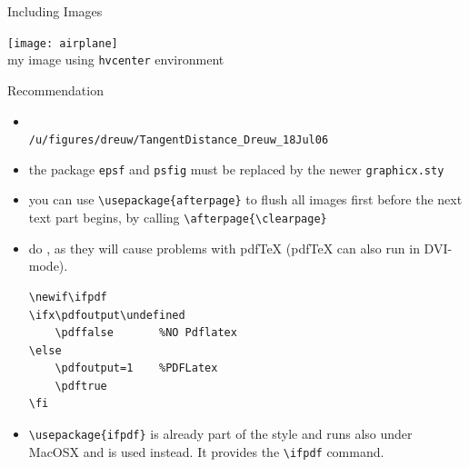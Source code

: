 \documentclass[11pt,a4paper,landscape]{article}
\begin{document}
\NewPage\centerline{Including Images}
\begin{hvcenter}
  \texttt{[image: airplane]}\\
  my image using \texttt{hvcenter} environment
\end{hvcenter}

\NewPage\centerline{Recommendation}
\vfill
\begin{itemize}
\item {} \\
  \eg \texttt{/u/figures/dreuw/TangentDistance\_Dreuw\_18Jul06}
\item the package \texttt{epsf} and \texttt{psfig} must be replaced by the newer
  \texttt{graphicx.sty}
\item you can use \texttt{\textbackslash usepackage\{afterpage\}} to flush all
  images first before the next text part begins, by calling
  \texttt{\textbackslash afterpage\{\textbackslash clearpage\}}
\item do , as they will cause
  problems with pdfTeX (pdfTeX can also run in DVI-mode).
\begin{verbatim}
\newif\ifpdf
\ifx\pdfoutput\undefined
    \pdffalse       %NO Pdflatex
\else
    \pdfoutput=1    %PDFLatex
    \pdftrue
\fi 
\end{verbatim}
\item \alert{\texttt{\textbackslash usepackage\{ifpdf\}}} is already part of the
  style and runs also under  MacOSX and is used instead. It
  provides the \texttt{\textbackslash ifpdf} command.
\end{itemize}
\vfill
\end{document}
